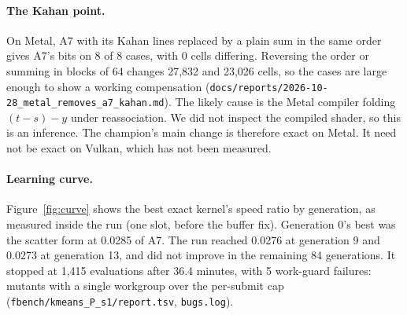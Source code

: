 \documentclass[sigconf,nonacm]{acmart}
\newcommand{\src}[1]{{\footnotesize\nolinkurl{#1}}}
\begin{document}
\paragraph{The Kahan point.} On Metal, A7 with its Kahan lines replaced by a
plain sum in the same order gives A7's bits on 8 of 8 cases, with 0 cells
differing. Reversing the order or summing in blocks of 64 changes 27,832 and
23,026 cells, so the cases are large enough to show a working compensation
(\src{docs/reports/2026-10-28_metal_removes_a7_kahan.md}). The likely cause is
the Metal compiler folding $(t-s)-y$ under reassociation. We did not inspect
the compiled shader, so this is an inference. The champion's main change is
therefore exact on Metal. It need not be exact on Vulkan, which has not been
measured.

\paragraph{Learning curve.} Figure~\ref{fig:curve} shows the best exact
kernel's speed ratio by generation, as measured inside the run (one slot,
before the buffer fix). Generation 0's best was the scatter form at 0.0285 of
A7. The run reached 0.0276 at generation 9 and 0.0273 at generation 13, and
did not improve in the remaining 84 generations. It stopped at 1,415
evaluations after 36.4 minutes, with 5 work-guard failures: mutants with a
single workgroup over the per-submit cap (\src{fbench/kmeans_P_s1/report.tsv},
\src{bugs.log}).
\end{document}
